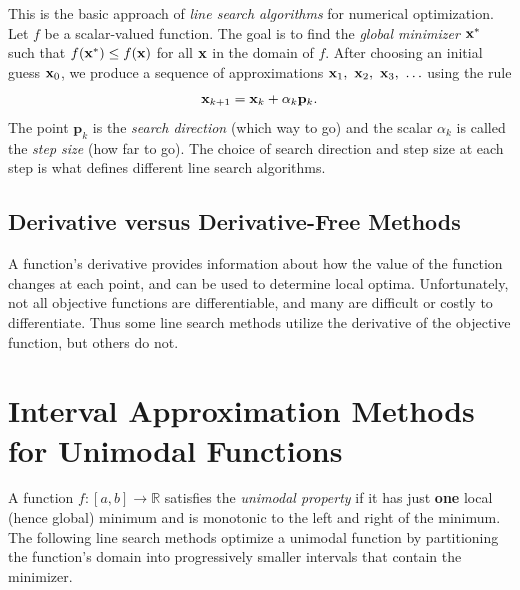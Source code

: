 This is the basic approach of \emph{line search algorithms} for numerical optimization.
Let $f$ be a scalar-valued function.
The goal is to find the \emph{global minimizer} $\mathbf{x}^*$ such that $f(\mathbf{x}^*) \le f(\mathbf{x})$ for all $\mathbf{x}$ in the domain of $f$.
After choosing an initial guess $\mathbf{x}_0$, we produce a sequence of approximations $\mathbf{x}_1,\ \mathbf{x}_2,\ \mathbf{x}_3,\ \ldots$ using the rule
\begin{equation}
    \mathbf{x}_{k+1} = \mathbf{x}_k + \alpha_k \mathbf{p}_k.
    \label{eq:line-search-iter}
\end{equation}
The point $\mathbf{p}_k$ is the \emph{search direction} (which way to go) and the scalar $\alpha_k$ is called the \emph{step size} (how far to go).
The choice of search direction and step size at each step is what defines different line search algorithms.

\subsection*{Derivative versus Derivative-Free Methods} %

A function's derivative provides information about how the value of the function changes at each point, and can be used to determine local optima.
Unfortunately, not all objective functions are differentiable, and many are difficult or costly to differentiate.
Thus some line search methods utilize the derivative of the objective function, but others do not.

\section*{Interval Approximation Methods for Unimodal Functions} %

A function $f:[a,b]\rightarrow\mathbb{R}$ satisfies the \emph{unimodal property} if it has just \textbf{one} local (hence global) minimum and is monotonic to the left and right of the minimum.
The following line search methods optimize a unimodal function by partitioning the function's domain into progressively smaller intervals that contain the minimizer.

